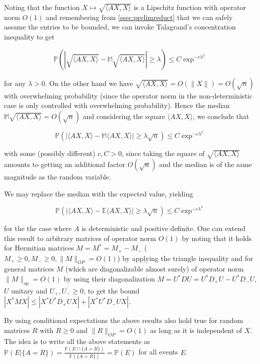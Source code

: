 Noting that the function $X\mapsto \sqrt{\langle AX,X\rangle}$ is a Lipschitz function with operator norm $O(1)$ and remembering from \ref{ssec:prelimreduct} that we can safely assume the entries to be bounded, we can invoke Talagrand's concentration inequality to get 

$$\mathbb P(|\sqrt{\langle AX,X\rangle}-\mathbb M\sqrt{\langle AX,X\rangle}|\geq\lambda)\leq C\exp^{-c\lambda^2}$$

for any $\lambda>0$. On the other hand we have $\sqrt{\langle AX,X\rangle}=O(\|X\|)=O(\sqrt n)$ with overwhelming probability (since the operator norm in the non-deterministic case is only controlled with overwhelming probability). Hence the median $\mathbb M\sqrt{\langle AX,X\rangle}=O(\sqrt n)$ and considering the square $\langle AX,X\rangle$, we conclude that

$$\mathbb P(|\langle AX,X\rangle-\mathbb M\langle AX,X\rangle|\geq\lambda\sqrt n)\leq C\exp^{-c\lambda^2}$$

with some (possibly different) $c,C>0$, since taking the square of $\sqrt{\langle AX,X\rangle}$ amounts to getting an additional factor $O(\sqrt n)$ and the median is of the same magnitude as the random variable.

We may replace the median with the expected value, yielding

\begin{equation}\label{eq:concentrationOfXRXAroundTrR}
	\mathbb P(|\langle AX,X\rangle-\mathbb E\langle AX,X\rangle|\geq\lambda\sqrt n)\leq C\exp^{-c\lambda^2}
\end{equation}

for the the case where $A$ is deterministic and positive definite. One can extend this result to arbitrary matrices of operator norm $O(1)$ by noting that it holds for Hermitian matrices $M=M^*=M_+-M_-$ ($M_+\geq 0,M_-\geq 0,\|M\|_{OP}=O(1)$) by applying the triangle inequality and for general matrices $M$ (which are diagonalizable almost surely) of operator norm $\|M\|_{op}=O(1)$ by using their diagonalization $M=U^*DU=U^*D_+U-U^*D_-U$, $U$ unitary and $U_+,U_-\geq 0$, to get the bound $|X^*MX|\leq|X^*U^*D_+UX|+|X^*U^*D_-UX|$.

\begin{remark}\label{rem:conditionalExpectationForDeterministicResult}
	By using conditional expectations the above results also hold true for random matrices $R$ with $R\geq 0$ and $\|R\|_{OP}=O(1)$ as long as it is independent of $X$. The idea is to write all the above statements as $\mathbb P(E|\{A=R\})=\frac{\mathbb P(E\cap\{A=R\})}{\mathbb P(\{A=R\})}=\mathbb P(E)$ for all events $E$.
\end{remark}

